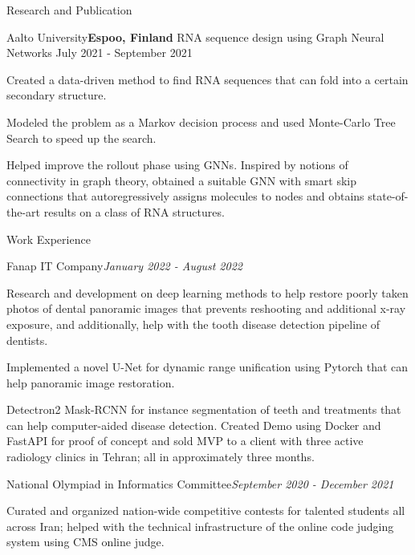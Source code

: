 \documentclass{resume} %
\begin{document}
\begin{rSection}{Research and Publication}
\begin{rSubsection}{Aalto University}{\textcolor{Black!70}{\bf Espoo, Finland}}
{RNA sequence design using Graph Neural Networks}
{\textcolor{Black!70}{July 2021 - September 2021}}{}
\begin{small}
\item Created a data-driven method to find RNA sequences that can fold into a certain secondary structure.
\item Modeled the problem as a Markov decision process and used Monte-Carlo Tree Search to speed up the search.
\item Helped improve the rollout phase using GNNs. Inspired by notions of connectivity in graph theory, obtained a suitable GNN with smart skip connections that autoregressively assigns molecules to nodes and obtains state-of-the-art results on a class of RNA structures.
\end{small}
\end{rSubsection}

\end{rSection}




\begin{rSection}{Work Experience}
\begin{small}
\begin{rSubsection}{Fanap IT Company}{\textcolor{Black!70}{\it January 2022 - August 2022}}{}{}
\itemsep -2pt
\item Research and development on deep learning methods to help restore poorly taken photos of dental panoramic images that prevents reshooting and additional x-ray exposure, and additionally, help with the tooth disease detection pipeline of dentists. 
\item Implemented a novel U-Net for dynamic range unification using Pytorch that can help panoramic image restoration.
\item Detectron2 Mask-RCNN for instance segmentation of teeth and treatments that can help computer-aided disease detection.
Created Demo using Docker and FastAPI for proof of concept and sold MVP to a client with three active radiology clinics in Tehran; all in approximately three months.

\end{rSubsection}
\begin{rSubsection}{National Olympiad in Informatics Committee}{\textcolor{Black!70}{\it September 2020 - December 2021}}{}{}
\itemsep -2pt
\item Curated and organized nation-wide competitive contests for talented students all across Iran; helped with the technical infrastructure of the online code judging system using CMS online judge.
\end{rSubsection}
\end{small}
\end{rSection}
\end{document}

